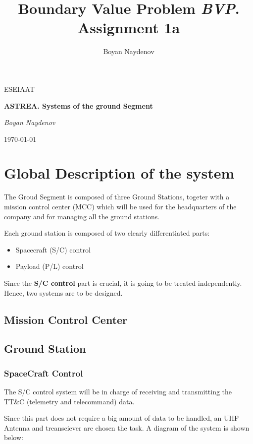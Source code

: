 \documentclass[12pt,a4paper]{article}
\author{Boyan Naydenov}
\title{Boundary Value Problem \textit{BVP}. Assignment 1a}
\begin{document}
\begin{titlepage}
	\centering
	\vspace{4.5cm}
	{\scshape ESEIAAT \par}
	{\scshape\Large \par}
	\vspace{1.5cm}
	{\huge\bfseries ASTREA. Systems of the ground Segment\par}
	\vspace{10cm}
	\vspace{3cm}
	{\Large\itshape Boyan Naydenov\par}
	\vfill
	\vspace{1cm}
	\today
\end{titlepage}
\tableofcontents
\pagebreak
\section{Global Description of the system}

The Groud Segment is composed of three Ground Stations, togeter with a mission control center (MCC) which will be used for the headquarters of the company and for managing all the ground stations.

Each ground station is composed of two clearly differentiated parts:
\begin{itemize}
\item Spacecraft (S/C) control
\item Payload (P/L) control
\end{itemize}

Since the \textbf{S/C control} part is crucial, it is going to be treated independently. Hence, two systems are to be designed.

\subsection{Mission Control Center}
\subsection{Ground Station}
\subsubsection{SpaceCraft Control}
The S/C control system will be in charge of receiving and transmitting the TT\&C (telemetry and telecommand) data.

Since this part does not require a big amount of data to be handled, an UHF Antenna and treansciever are chosen the task. A diagram of the system is shown below:
\end{document}

